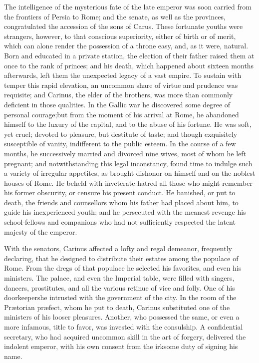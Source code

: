 The intelligence of the mysterious fate of the late emperor was
soon carried from the frontiers of Persia to Rome; and the
senate, as well as the provinces, congratulated the accession of
the sons of Carus. These fortunate youths were strangers,
however, to that conscious superiority, either of birth or of
merit, which can alone render the possession of a throne easy,
and, as it were, natural. Born and educated in a private station,
the election of their father raised them at once to the rank of
princes; and his death, which happened about sixteen months
afterwards, left them the unexpected legacy of a vast empire. To
sustain with temper this rapid elevation, an uncommon share of
virtue and prudence was requisite; and Carinus, the elder of the
brothers, was more than commonly deficient in those qualities. In
the Gallic war he discovered some degree of personal courage;\footnotemark[80]
but from the moment of his arrival at Rome, he abandoned himself
to the luxury of the capital, and to the abuse of his fortune. He
was soft, yet cruel; devoted to pleasure, but destitute of taste;
and though exquisitely susceptible of vanity, indifferent to the
public esteem. In the course of a few months, he successively
married and divorced nine wives, most of whom he left pregnant;
and notwithstanding this legal inconstancy, found time to indulge
such a variety of irregular appetites, as brought dishonor on
himself and on the noblest houses of Rome. He beheld with
inveterate hatred all those who might remember his former
obscurity, or censure his present conduct. He banished, or put to
death, the friends and counsellors whom his father had placed
about him, to guide his inexperienced youth; and he persecuted
with the meanest revenge his school-fellows and companions who
had not sufficiently respected the latent majesty of the emperor.

With the senators, Carinus affected a lofty and regal demeanor,
frequently declaring, that he designed to distribute their
estates among the populace of Rome. From the dregs of that
populace he selected his favorites, and even his ministers. The
palace, and even the Imperial table, were filled with singers,
dancers, prostitutes, and all the various retinue of vice and
folly. One of his doorkeepers\footnotemark[81] he intrusted with the government
of the city. In the room of the Prætorian præfect, whom he put to
death, Carinus substituted one of the ministers of his looser
pleasures. Another, who possessed the same, or even a more
infamous, title to favor, was invested with the consulship. A
confidential secretary, who had acquired uncommon skill in the
art of forgery, delivered the indolent emperor, with his own
consent from the irksome duty of signing his name.

